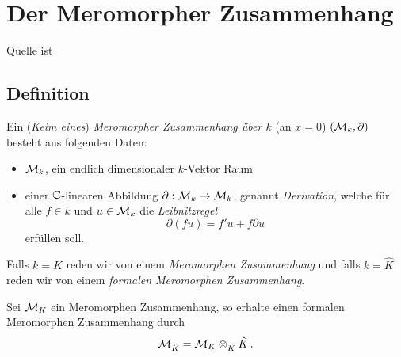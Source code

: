 
\chapter{Der Meromorpher Zusammenhang}
Quelle ist \cite{sabbah_cimpa90}
\section{Definition}

\begin{defn}
  Ein (\emph{Keim eines}) \emph{Meromorpher Zusammenhang über $k$} (an $x=0$)
  $(\mathcal{M}_k,\partial)$ besteht aus folgenden Daten:
  \begin{itemize}
    \item $\mathcal{M}_k$, ein endlich dimensionaler $k$-Vektor Raum
    \item einer $\mathbb{C}$-linearen Abbildung $\partial:\mathcal{M}_k\rightarrow \mathcal{M}_k$,
      genannt \emph{Derivation}, welche für alle $f\in k$ und $u\in \mathcal{M}_k$ die
      \emph{Leibnitzregel}
      \begin{equation}\label{eq:Leibnitzregel}
        \partial(fu)=f'u+f\partial u
      \end{equation}
      erfüllen soll.
  \end{itemize}
  Falls $k=K$ reden wir von einem \emph{Meromorphen Zusammenhang}
  und falls $k=\hat K$ reden wir von einem \emph{formalen Meromorphen
  Zusammenhang}.
\end{defn}
\begin{bem}
  Sei $\mathcal{M}_K$ ein Meromorphen Zusammenhang, so erhalte einen formalen
  Meromorphen Zusammenhang durch
  \[ \mathcal{M}_{\hat K} = \mathcal{M}_K\otimes_{\hat K}\hat K \,. \]
\end{bem}

